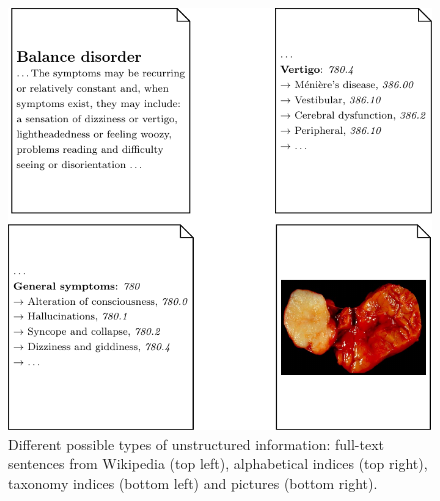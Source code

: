 \begin{figure}
	\centering
	\includegraphics[scale=0.7]{fig/01dataint/foldedfulltext}
	\caption{Different possible types of unstructured information: full-text sentences from Wikipedia (top left), alphabetical indices (top right), taxonomy indices (bottom left) and pictures (bottom right).}
	\label{fig:unstructuredmedical}
\end{figure}

